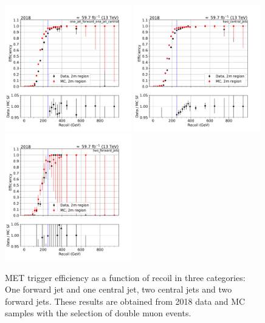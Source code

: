 \begin{figure}[htp]
    \begin{center}
        \includegraphics[width=0.49\textwidth]{fig/efficiency/trigger/met/recoil/data_mc_comparison_2m_2018_one_jet_forward_one_jet_central.pdf}
        \includegraphics[width=0.49\textwidth]{fig/efficiency/trigger/met/recoil/data_mc_comparison_2m_2018_two_central_jets.pdf} \\
        \includegraphics[width=0.49\textwidth]{fig/efficiency/trigger/met/recoil/data_mc_comparison_2m_2018_two_forward_jets.pdf}
    \end{center}
    \caption{MET trigger efficiency as a function of recoil in three categories: One forward jet and one central jet, two central jets and
            two forward jets. These results are obtained from 2018 data and MC samples with the selection of double muon events.}
    \label{fig:eff_recoil_2018_2m}
\end{figure}

